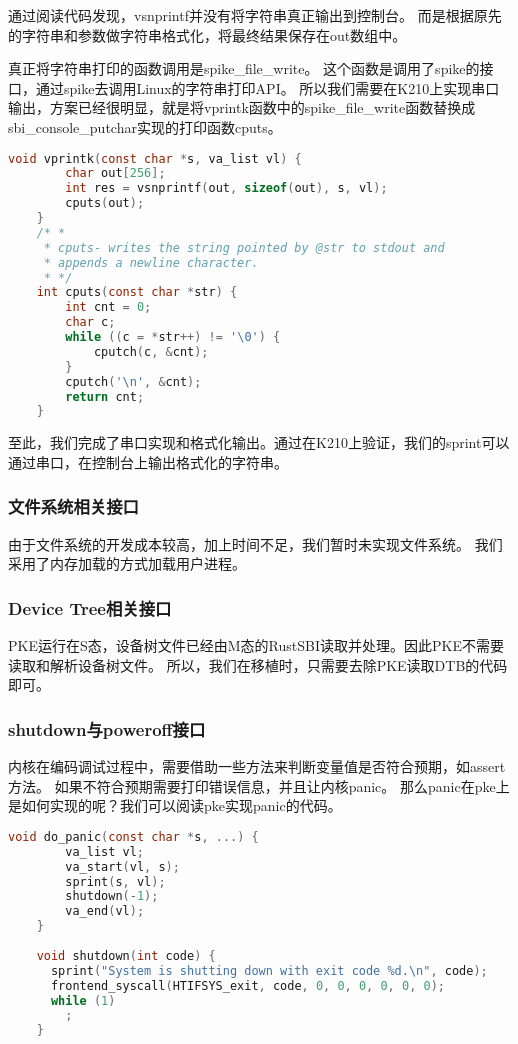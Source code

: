 通过阅读代码发现，vsnprintf并没有将字符串真正输出到控制台。
而是根据原先的字符串和参数做字符串格式化，将最终结果保存在out数组中。

真正将字符串打印的函数调用是spike\_file\_write。
这个函数是调用了spike的接口，通过spike去调用Linux的字符串打印API。
所以我们需要在K210上实现串口输出，方案已经很明显，就是将vprintk函数中的spike\_file\_write函数替换成sbi\_console\_putchar实现的打印函数cputs。

\begin{lstlisting}[language=C, caption={vprintk改造代码}, label={lst:vprintk_dev} ]
    void vprintk(const char *s, va_list vl) {
        char out[256];
        int res = vsnprintf(out, sizeof(out), s, vl);
        cputs(out);
    }
    /* *
     * cputs- writes the string pointed by @str to stdout and
     * appends a newline character.
     * */
    int cputs(const char *str) {
        int cnt = 0;
        char c;
        while ((c = *str++) != '\0') {
            cputch(c, &cnt);
        }
        cputch('\n', &cnt);
        return cnt;
    }   
\end{lstlisting}

至此，我们完成了串口实现和格式化输出。通过在K210上验证，我们的sprint可以通过串口，在控制台上输出格式化的字符串。

\subsubsection{文件系统相关接口}

由于文件系统的开发成本较高，加上时间不足，我们暂时未实现文件系统。
我们采用了内存加载的方式加载用户进程。

\subsubsection{Device Tree相关接口}

PKE运行在S态，设备树文件已经由M态的RustSBI读取并处理。因此PKE不需要读取和解析设备树文件。
所以，我们在移植时，只需要去除PKE读取DTB的代码即可。

\subsubsection{shutdown与poweroff接口}

内核在编码调试过程中，需要借助一些方法来判断变量值是否符合预期，如assert方法。
如果不符合预期需要打印错误信息，并且让内核panic。
那么panic在pke上是如何实现的呢？我们可以阅读pke实现panic的代码。

\begin{lstlisting}[language=C, caption={panic实现代码}, label={lst:panic} ]
    void do_panic(const char *s, ...) {
        va_list vl;
        va_start(vl, s);
        sprint(s, vl);
        shutdown(-1);
        va_end(vl);
    }
    
    void shutdown(int code) {
      sprint("System is shutting down with exit code %d.\n", code);
      frontend_syscall(HTIFSYS_exit, code, 0, 0, 0, 0, 0, 0);
      while (1)
        ;
    }    
\end{lstlisting}

